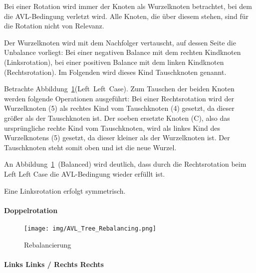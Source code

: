 Bei einer Rotation wird immer der Knoten als Wurzelknoten betrachtet, bei dem
die AVL-Bedingung verletzt wird.
Alle Knoten, die über diesem stehen, sind für die Rotation nicht von Relevanz.

Der Wurzelknoten wird mit dem Nachfolger vertauscht, auf dessen Seite die
Unbalance vorliegt:
Bei einer negativen Balance mit dem rechten Kindknoten (Linksrotation),
bei einer positiven Balance mit dem linken Kindknoten (Rechtsrotation).
Im Folgenden wird dieses Kind Tauschknoten genannt.

Betrachte Abbildung~\ref{fig:AVL-Cases}(Left~Left~Case).
Zum Tauschen der beiden Knoten werden folgende Operationen ausgeführt:
Bei einer Rechtsrotation wird der Wurzelknoten (5) als rechtes Kind vom
Tauschknoten (4) gesetzt, da dieser größer als der Tauschknoten ist.
Der soeben ersetzte Knoten (C), also das ursprüngliche rechte Kind vom
Tauschknoten, wird als linkes Kind des Wurzelknotens (5) gesetzt,
da dieser kleiner als der Wurzelknoten ist.
Der Tauschknoten steht somit oben und ist die neue Wurzel.

An Abbildung~\ref{fig:AVL-Cases}~(Balanced) wird deutlich, dass durch die
Rechtsrotation beim Left Left Case die AVL-Bedingung wieder erfüllt ist.

Eine Linksrotation erfolgt symmetrisch.

\paragraph{Doppelrotation}


\begin{figure}
    \centering
    \texttt{[image: img/AVL\_Tree\_Rebalancing.png]}
    \caption{Rebalancierung}
    \label{fig:AVL-Cases}
\end{figure}




\paragraph{Links Links / Rechts Rechts}
